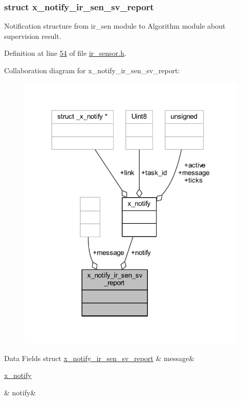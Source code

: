 \subsubsection{struct x\+\_\+notify\+\_\+ir\+\_\+sen\+\_\+sv\+\_\+report}
Notification structure from ir\+\_\+sen module to Algorithm module about supervision result. 

Definition at line \hyperlink{a00017_source_l00054}{54} of file \hyperlink{a00017_source}{ir\+\_\+sensor.\+h}.



Collaboration diagram for x\+\_\+notify\+\_\+ir\+\_\+sen\+\_\+sv\+\_\+report\+:\nopagebreak
\begin{figure}[H]
\begin{center}
\leavevmode
\includegraphics[width=311pt]{d9/dfb/a00913}
\end{center}
\end{figure}
\begin{DoxyFields}{Data Fields}
\hypertarget{a00017_a6a41483eec7414046af9984739e64426}{struct \hyperlink{a00017_da/de6/a00855}{x\+\_\+notify\+\_\+ir\+\_\+sen\+\_\+sv\+\_\+report}}\label{a00017_a6a41483eec7414046af9984739e64426}
&
message&
\\
\hline

\hypertarget{a00017_a8e6a04c2283f9fd7b8dcbc62faba5847}{\hyperlink{a00036_df/d4c/a00851}{x\+\_\+notify}}\label{a00017_a8e6a04c2283f9fd7b8dcbc62faba5847}
&
notify&
\\
\hline

\end{DoxyFields}
\label{dd/dcb/a00375}
\hypertarget{a00017_dd/dcb/a00375}{}

